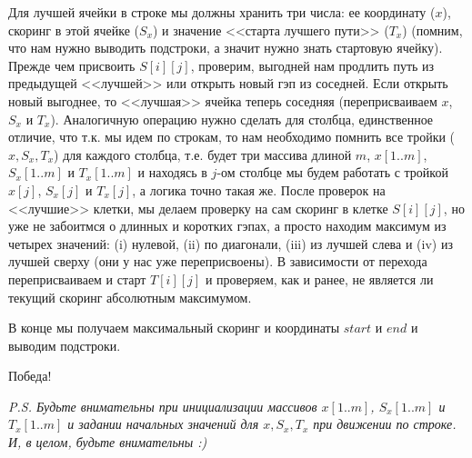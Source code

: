 \documentclass[letterpaper, 11pt]{article}
\begin{document}
Для лучшей ячейки в строке мы должны хранить три числа: ее координату ($x$), скоринг в этой ячейке ($S_x$) и значение <<старта лучшего пути>> ($T_x$) (помним, что нам нужно выводить подстроки, а значит нужно знать стартовую ячейку). Прежде чем присвоить $S[i][j]$, проверим, выгодней нам продлить путь из предыдущей <<лучшей>> или открыть новый гэп из соседней. Если открыть новый выгоднее, то <<лучшая>> ячейка теперь соседняя (переприсваиваем $x$, $S_x$ и $T_x$). Аналогичную операцию нужно сделать для столбца, единственное отличие, что т.к. мы идем по строкам, то нам необходимо помнить все тройки ($x, S_x, T_x$) для каждого столбца, т.е. будет три массива длиной $m$, $x[1..m]$, $S_x[1..m]$ и $T_x[1..m]$ и находясь в $j$-ом столбце мы будем работать с тройкой $x[j]$, $S_x[j]$ и $T_x[j]$, а логика точно такая же. После проверок на <<лучшие>> клетки, мы делаем проверку на сам скоринг в клетке $S[i][j]$, но уже не забоитмся о длинных и коротких гэпах, а просто находим максимум из четырех значений: (i) нулевой, (ii) по диагонали, (iii) из лучшей слева и (iv) из лучшей сверху (они у нас уже переприсвоены). В зависимости от перехода переприсваиваем и старт $T[i][j]$ и проверяем, как и ранее, не является ли текущий скоринг абсолютным максимумом.

В конце мы получаем максимальный скоринг и координаты $start$ и $end$ и выводим подстроки.

Победа!

\textit{P.S. Будьте внимательны при инициализации массивов $x[1..m]$, $S_x[1..m]$ и $T_x[1..m]$ и задании начальных значений для $x, S_x, T_x$ при движении по строке. И, в целом, будьте внимательны :)}
\end{document}
